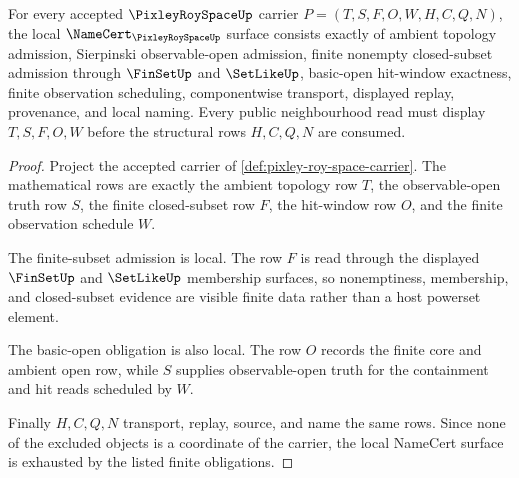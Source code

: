 \begin{theorem}
\label{thm:pixley-roy-space-namecert-obligations}
For every accepted $\PixleyRoySpaceUp$ carrier $P=(T,S,F,O,W,H,C,Q,N)$, the local $\NameCert_{\PixleyRoySpaceUp}$ surface consists exactly of ambient topology admission, Sierpinski observable-open admission, finite nonempty closed-subset admission through $\FinSetUp$ and $\SetLikeUp$, basic-open hit-window exactness, finite observation scheduling, componentwise transport, displayed replay, provenance, and local naming. Every public neighbourhood read must display $T,S,F,O,W$ before the structural rows $H,C,Q,N$ are consumed.
\end{theorem}
\begin{proof}
Project the accepted carrier of \autoref{def:pixley-roy-space-carrier}. The mathematical rows are exactly the ambient topology row $T$, the observable-open truth row $S$, the finite closed-subset row $F$, the hit-window row $O$, and the finite observation schedule $W$.

The finite-subset admission is local. The row $F$ is read through the displayed $\FinSetUp$ and $\SetLikeUp$ membership surfaces, so nonemptiness, membership, and closed-subset evidence are visible finite data rather than a host powerset element.

The basic-open obligation is also local. The row $O$ records the finite core and ambient open row, while $S$ supplies observable-open truth for the containment and hit reads scheduled by $W$.

Finally $H,C,Q,N$ transport, replay, source, and name the same rows. Since none of the excluded objects is a coordinate of the carrier, the local NameCert surface is exhausted by the listed finite obligations.
\end{proof}

